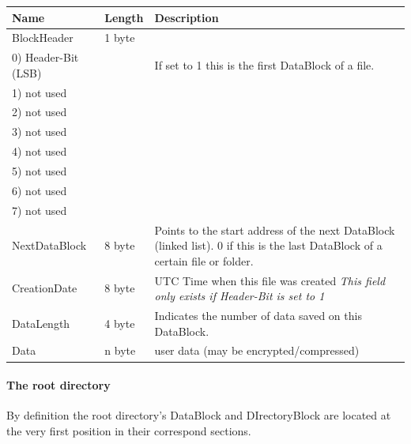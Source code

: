 \begin{tabular}{|l|l|p{5cm}|}
\hline
\textbf{Name} & \textbf{Length} & \textbf{Description}
\\  \hline
BlockHeader & 1 byte &
\\
\hspace{0.2cm} 0) Header-Bit (LSB) & &  If set to 1 this is the first DataBlock
of a file.
\\
\hspace{0.2cm} 1) not used & &
\\
\hspace{0.2cm} 2) not used & &
\\
\hspace{0.2cm} 3) not used & &
\\
\hspace{0.2cm} 4) not used & &
\\
\hspace{0.2cm} 5) not used & &
\\
\hspace{0.2cm} 6) not used & &
\\
\hspace{0.2cm} 7) not used & &

\\  \hline
NextDataBlock & 8 byte &
Points to the start address of the next DataBlock (linked list).
0 if this is the last DataBlock of a certain file or folder.
\\  \hline
CreationDate & 8 byte & UTC Time when this file was created
\newline \textit{This field only exists if Header-Bit is set to 1}
\\  \hline

DataLength & 4 byte &
Indicates the number of data saved on this DataBlock.

\\  \hline
Data & n byte & user data (may be encrypted/compressed)
\\  \hline
\end{tabular}


\paragraph{The root directory}

By definition the root directory's DataBlock and DIrectoryBlock are located at the very first position in their correspond sections.

